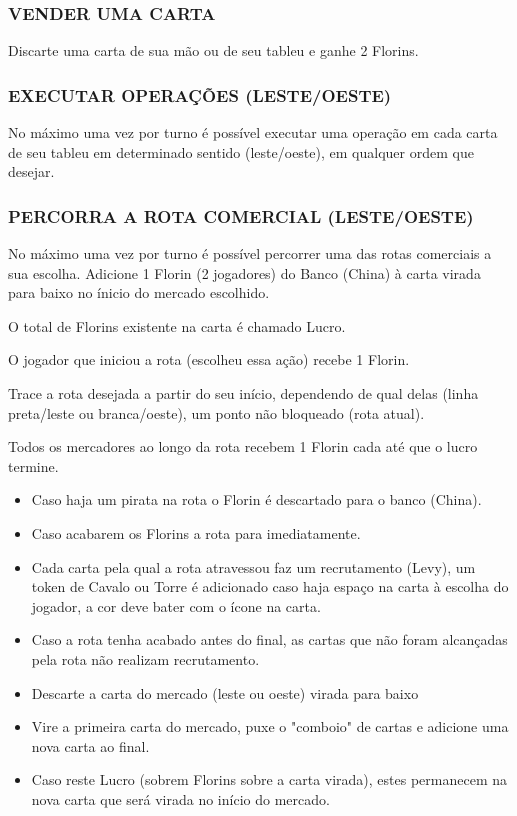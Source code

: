 \documentclass[11pt]{article}
\begin{document}
\subsubsection{VENDER UMA CARTA}
\label{sec:orge9d6fdf}

Discarte uma carta de sua mão ou de seu tableu e ganhe 2 Florins.

\subsubsection{EXECUTAR OPERAÇÕES (LESTE/OESTE)}
\label{sec:org8477ed9}

No máximo uma vez por turno é possível executar uma operação em cada carta de seu tableu em determinado sentido (leste/oeste), em qualquer ordem que desejar.

\subsubsection{PERCORRA A ROTA COMERCIAL (LESTE/OESTE)}
\label{sec:org2f82827}

No máximo uma vez por turno é possível percorrer uma das rotas comerciais a sua escolha. Adicione 1 Florin (2 jogadores) do Banco (China) à carta virada para baixo no ínicio do mercado escolhido.

O total de Florins existente na carta é chamado Lucro.

O jogador que iniciou a rota (escolheu essa ação) recebe 1 Florin.

Trace a rota desejada a partir do seu início, dependendo de qual delas (linha preta/leste ou branca/oeste), um ponto não bloqueado (rota atual).

Todos os mercadores ao longo da rota recebem 1 Florin cada até que o lucro termine.

\begin{itemize}
\item Caso haja um pirata na rota o Florin é descartado para o banco (China).

\item Caso acabarem os Florins a rota para imediatamente.

\item Cada carta pela qual a rota atravessou faz um recrutamento (Levy), um token de Cavalo ou Torre é adicionado caso haja espaço na carta à escolha do jogador, a cor deve bater com o ícone na carta.

\item Caso a rota tenha acabado antes do final, as cartas que não foram alcançadas pela rota não realizam recrutamento.

\item Descarte a carta do mercado (leste ou oeste) virada para baixo

\item Vire a primeira carta do mercado, puxe o "comboio" de cartas e adicione uma nova carta ao final.

\item Caso reste Lucro (sobrem Florins sobre a carta virada), estes permanecem na nova carta que será virada no início do  mercado.
\end{itemize}
\end{document}

